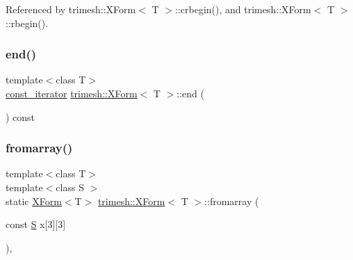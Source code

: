 Referenced by trimesh\+::\+X\+Form$<$ T $>$\+::crbegin(), and trimesh\+::\+X\+Form$<$ T $>$\+::rbegin().

\mbox{\label{classtrimesh_1_1XForm_a065733b995c5b9c6b7f9bf36ef2b6514}} 
\subsubsection{\texorpdfstring{end()}{end()}\hspace{0.1cm}{\footnotesize\ttfamily [2/2]}}
{\footnotesize\ttfamily template$<$class T$>$ \\
\hyperlink{classtrimesh_1_1XForm_af342cefd0ecc382861c2d89f24423d71}{const\+\_\+iterator} \hyperlink{classtrimesh_1_1XForm}{trimesh\+::\+X\+Form}$<$ T $>$\+::end (\begin{DoxyParamCaption}{ }\end{DoxyParamCaption}) const\hspace{0.3cm}{\ttfamily [inline]}}

\mbox{\label{classtrimesh_1_1XForm_aff7d15fe843a7cae87d76ea141619f06}} 
\subsubsection{\texorpdfstring{fromarray()}{fromarray()}\hspace{0.1cm}{\footnotesize\ttfamily [1/2]}}
{\footnotesize\ttfamily template$<$class T$>$ \\
template$<$class S $>$ \\
static \hyperlink{classtrimesh_1_1XForm}{X\+Form}$<$T$>$ \hyperlink{classtrimesh_1_1XForm}{trimesh\+::\+X\+Form}$<$ T $>$\+::fromarray (\begin{DoxyParamCaption}\item[{const \hyperlink{ego_8cc_abde73cd36321648268fb4543509b996a}{S}}]{x\mbox{[}3\mbox{]}\mbox{[}3\mbox{]} }\end{DoxyParamCaption})\hspace{0.3cm}{\ttfamily [inline]}, {\ttfamily [static]}}

\mbox{\label{classtrimesh_1_1XForm_a941cd6850d76992566ca3fa09ba89cfd}} 
